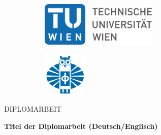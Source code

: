 \newcommand{\thesistitle}{Titel der Diplomarbeit (Deutsch/Englisch)}
\newcommand{\thesisdegree}{Diplom-Ingenieur/in}
\newcommand{\thesisstudies}{Bezeichnung des Studiums}
\newcommand{\thesisauthor}{Martina Muster}
\newcommand{\thesisstudentnumber}{01234567}
\newcommand{\thesisinstitute}{XYZ}
\newcommand{\thesisfaculty}{XYZ}
\newcommand{\thesisuniversity}{Technischen Universit\"{a}t Wien}
\newcommand{\thesiscollaboration}{XYZ}
\newcommand{\thesissupervisor}{Titel Dr. Vorname Familienname}
\newcommand{\thesiscosupervisor}{Univ.-Ass. Dr. Vorname Familienname}
\newcommand{\thesisplace}{Wien}
\newcommand{\thesisdate}{TT.MM.JJJJ}

\thispagestyle{empty}
\begin{titlepage}

  \begingroup
  \selectfont

  \begin{figure}[h]
    \centering
    \begin{subfigure}{.5\textwidth}
      \flushleft
      \includegraphics[height=60pt]{figs/TU_Logo.pdf}
    \end{subfigure}%
    \begin{subfigure}{.5\textwidth}
      \flushright
      \includegraphics[height=60pt]{figs/fakultaet-physik_logo.png}
    \end{subfigure}
  \end{figure}

  \vspace*{1.5cm}
  
  \begin{center}
    {\Large DIPLOMARBEIT}
    
    \vspace{2.25cm}
    
    {\huge\textbf{\thesistitle}}


\end{center}
\end{titlepage}
